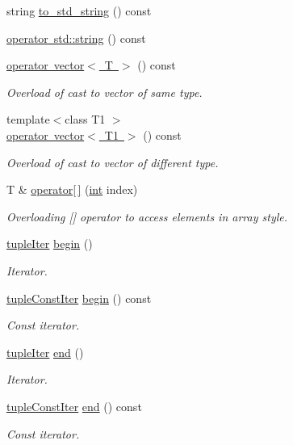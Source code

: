 \begin{DoxyCompactItemize}
string \mbox{\hyperlink{class_tuple_a2c8e5f6fb1abb2b11ab222b7ce772569}{to\+\_\+std\+\_\+string}} () const
\item 
\mbox{\hyperlink{class_tuple_a9a4516890830c7a8bf96c9325718c8c3}{operator std\+::string}} () const
\item 
\mbox{\hyperlink{class_tuple_a4189d6fe009e00fbc81061bcad9ee856}{operator vector$<$ T $>$}} () const
\begin{DoxyCompactList}\small\item\em Overload of cast to vector of same type. \end{DoxyCompactList}\item 
{\footnotesize template$<$class T1 $>$ }\\\mbox{\hyperlink{class_tuple_a924a25df1578ffab148c69a1a1000491}{operator vector$<$ T1 $>$}} () const
\begin{DoxyCompactList}\small\item\em Overload of cast to vector of different type. \end{DoxyCompactList}\item 
T \& \mbox{\hyperlink{class_tuple_ae18a93053af932997709798b3fd5d12d}{operator\mbox{[}$\,$\mbox{]}}} (\mbox{\hyperlink{draw_8hh_aa620a13339ac3a1177c86edc549fda9b}{int}} index)
\begin{DoxyCompactList}\small\item\em Overloading \mbox{[}\mbox{]} operator to access elements in array style. \end{DoxyCompactList}\item 
\mbox{\hyperlink{maths_8hh_ad22dcdeefda7d41523cc1604953eb6cc}{tuple\+Iter}} \mbox{\hyperlink{class_tuple_a205dfb3c3dcad03ced830b5c9687d225}{begin}} ()
\begin{DoxyCompactList}\small\item\em Iterator. \end{DoxyCompactList}\item 
\mbox{\hyperlink{maths_8hh_a2eba794860251c1b30e532df32ee4d1b}{tuple\+Const\+Iter}} \mbox{\hyperlink{class_tuple_ab5d618dac69995db6adb0e657cd73bb3}{begin}} () const
\begin{DoxyCompactList}\small\item\em Const iterator. \end{DoxyCompactList}\item 
\mbox{\hyperlink{maths_8hh_ad22dcdeefda7d41523cc1604953eb6cc}{tuple\+Iter}} \mbox{\hyperlink{class_tuple_a345d8a3efbf58fe4cc7295c3cf66e8ab}{end}} ()
\begin{DoxyCompactList}\small\item\em Iterator. \end{DoxyCompactList}\item 
\mbox{\hyperlink{maths_8hh_a2eba794860251c1b30e532df32ee4d1b}{tuple\+Const\+Iter}} \mbox{\hyperlink{class_tuple_ac55a72437773f17dd8fbccf866d7e7eb}{end}} () const
\begin{DoxyCompactList}\small\item\em Const iterator. \end{DoxyCompactList}\end{DoxyCompactItemize}
